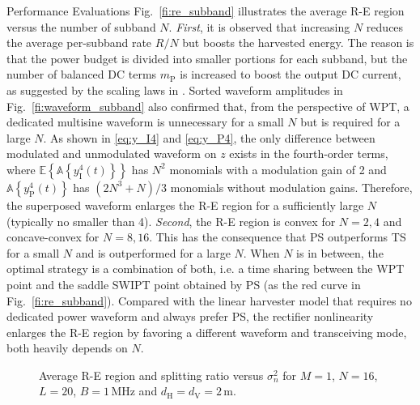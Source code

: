 \documentclass[journal]{IEEEtran}
\begin{document}
\begin{section}{Performance Evaluations}
		Fig.~\ref{fi:re_subband} illustrates the average R-E region versus the number of subband $N$. \textit{First}, it is observed that increasing $N$ reduces the average per-subband rate $R/N$ but boosts the harvested energy. The reason is that the power budget is divided into smaller portions for each subband, but the number of balanced DC terms $m_\mathrm{P}$ is increased to boost the output DC current, as suggested by the scaling laws in \cite{Clerckx2018b}. Sorted waveform amplitudes in Fig.~\ref{fi:waveform_subband} also confirmed that, from the perspective of WPT, a dedicated multisine waveform is unnecessary for a small $N$ but is required for a large $N$. As shown in \eqref{eq:y_I4} and \eqref{eq:y_P4}, the only difference between modulated and unmodulated waveform on $z$ exists in the fourth-order terms, where $\mathbb{E}\left\{\mathbb{A}\left\{y_{\mathrm{I}}^4(t)\right\}\right\}$ has $N^2$ monomials with a modulation gain of \num{2} and $\mathbb{A}\left\{y_{\mathrm{P}}^4(t)\right\}$ has $(2N^3+N)/3$ monomials without modulation gains. Therefore, the superposed waveform enlarges the R-E region for a sufficiently large $N$ (typically no smaller than 4). \textit{Second}, the R-E region is convex for $N = 2, 4$ and concave-convex for $N = 8, 16$. This has the consequence that PS outperforms TS for a small $N$ and is outperformed for a large $N$. When $N$ is in between, the optimal strategy is a combination of both, i.e. a time sharing between the WPT point and the saddle SWIPT point obtained by PS (as the red curve in Fig.~\ref{fi:re_subband}). Compared with the linear harvester model that requires no dedicated power waveform and always prefer PS, the rectifier nonlinearity enlarges the R-E region by favoring a different waveform and transceiving mode, both heavily depends on $N$.

		\begin{figure}[!t]
			\centering
			\begin{adjustbox}{width=0.9\columnwidth}
				
			\end{adjustbox}
			\caption{Average R-E region and splitting ratio versus $\sigma_n^2$ for $M=1$, $N=16$, $L=20$, $B=1\,\si{\MHz}$ and $d_{\mathrm{H}}=d_{\mathrm{V}}=2\,\si{\meter}$.}
			\label{fi:re_noise}
		\end{figure}


\end{section}
\end{document}
